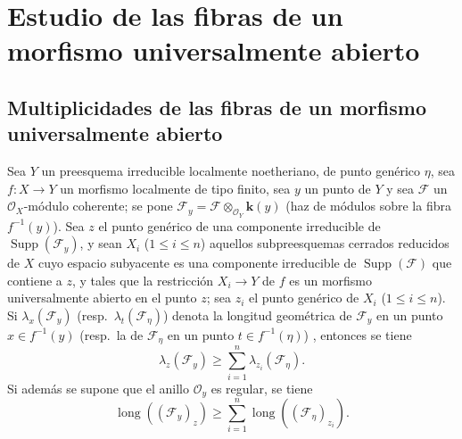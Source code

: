 \section{Estudio de las fibras de un morfismo universalmente abierto}
\label{section:IV.15}

\subsection{Multiplicidades de las fibras de un morfismo universalmente abierto}
\label{subsection:IV.15.1}

\begin{proposition}[15.1.1]
\label{IV.15.1.1}
Sea $Y$ un preesquema irreducible localmente noetheriano, de punto genérico $\eta$, sea $f:X\to Y$ un morfismo localmente de tipo finito, sea $y$ un punto de $Y$ y sea $\mathcal F$ un $\mathcal O_X$-módulo coherente;
se pone $\mathcal F_y=\mathcal F\otimes_{\mathcal O_Y}\boldsymbol{k}(y)$ \textup{(haz de módulos sobre la fibra $f^{-1}(y)$)}.
Sea $z$ el punto genérico de una componente irreducible de $\operatorname{Supp}(\mathcal F_y)$, y sean $X_i$ ($1\leqslant i\leqslant n$) aquellos subpreesquemas cerrados reducidos de $X$ cuyo espacio subyacente es una componente irreducible de $\operatorname{Supp}(\mathcal F)$ que contiene a $z$, y tales que la restricción $X_i\to Y$ de $f$ es un morfismo universalmente abierto en el punto $z$; sea $z_i$ el punto genérico de $X_i$ ($1\leqslant i\leqslant n$).
Si $\lambda_x(\mathcal F_y)$ (\textup{resp.}~$\lambda_t(\mathcal F_\eta)$) denota la longitud geométrica de $\mathcal F_y$ en un punto $x\in f^{-1}(y)$ (\textup{resp.}~la de $\mathcal F_\eta$ en un punto $t\in f^{-1}(\eta)$) , entonces se tiene
\[
\tag{15.1.1.1}
\label{IV.15.1.1.1-fr}
  \lambda_z(\mathcal F_y)\geqslant
  \sum_{i=1}^{n}\lambda_{z_i}(\mathcal F_\eta).
\]
Si además se supone que el anillo $\mathcal O_y$ es regular, se tiene
\[
\tag{15.1.1.2}
\label{IV.15.1.1.2-fr}
  \operatorname{long}((\mathcal F_y)_z)\geqslant
  \sum_{i=1}^{n}\operatorname{long}((\mathcal F_\eta)_{z_i}).
\]
\end{proposition}

